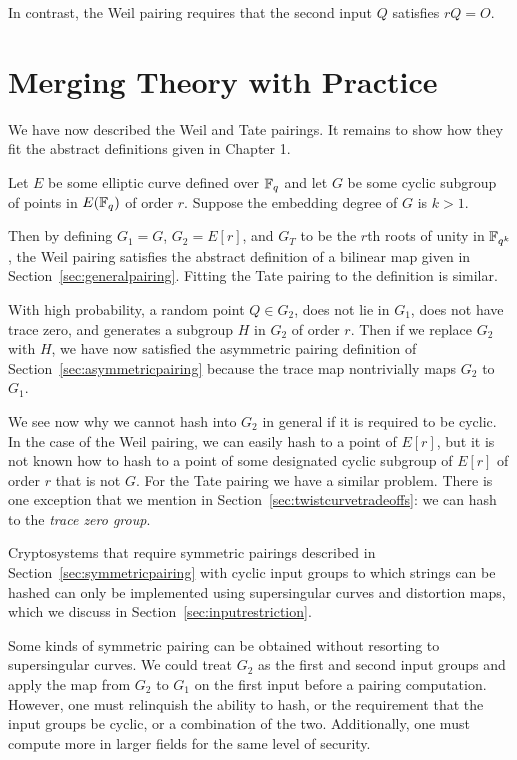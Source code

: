 In contrast, the Weil pairing requires that the second
input $Q$ satisfies $r Q = O$.

\section {Merging Theory with Practice}

We have now described the Weil and Tate pairings. It remains to show
how they fit the abstract definitions given in Chapter 1.

Let $E$ be some elliptic curve defined over $\mathbb{F}_q$ and let $G$ be some
cyclic subgroup of points in $E(\mathbb{F}_q)$ of order $r$.
Suppose the embedding degree of $G$ is $k > 1$.

Then by defining $G_1 = G$, $G_2 = E[r]$, and $G_T$ to be the $r$th roots
of unity in $\mathbb{F}_{q^k}$, the Weil pairing satisfies the abstract
definition of a bilinear map given in Section~\ref{sec:generalpairing}.
Fitting the Tate pairing to the definition is similar.

With high probability, a random point $Q \in G_2$, does not
lie in $G_1$, does not have trace zero,
and generates a subgroup $H$ in $G_2$ of order $r$. Then
if we replace $G_2$ with $H$, we have now satisfied the asymmetric pairing
definition of Section~\ref{sec:asymmetricpairing} because the
trace map nontrivially maps $G_2$ to $G_1$.

We see now why we cannot hash into $G_2$ in general if it is required
to be cyclic.
In the case of the Weil pairing, we can easily hash to a point of $E[r]$,
but it is not known how to hash to a point of
some designated cyclic subgroup of $E[r]$ of order $r$ that is not $G$. 
For the Tate pairing we have a similar problem. There is one exception
that we mention in Section~\ref{sec:twistcurvetradeoffs}: we can hash to the
\emph{trace zero group}.

Cryptosystems that require
symmetric pairings described in Section~\ref{sec:symmetricpairing} with
cyclic input groups to which strings can be hashed can only be implemented
using supersingular curves and distortion maps, which
we discuss in Section~\ref{sec:inputrestriction}.

Some kinds of symmetric pairing can be obtained without resorting to
supersingular curves. We could treat $G_2$ as the first and second input
groups and apply the map from $G_2$ to $G_1$ on the first
input before a pairing computation. However, one must relinquish the
ability to hash, or the requirement that the input groups be cyclic, or
a combination of the two. Additionally, one must compute more
in larger fields for the same level of security.

